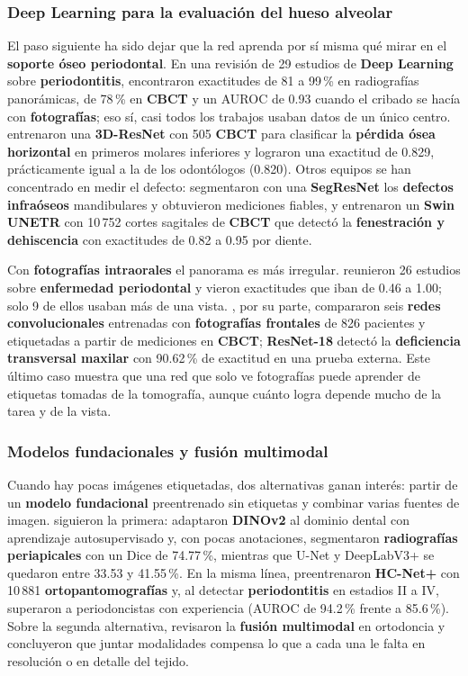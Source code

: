 \documentclass[12pt,a4paper]{article}
\newcommand{\prob}[1]{\textcolor{problema}{\textbf{#1}}}
\newcommand{\sol}[1]{\textcolor{solucion}{\textbf{#1}}}
\newcommand{\dat}[1]{\textcolor{dataset}{\textbf{#1}}}
\newcommand{\prob}[1]{#1}
\newcommand{\sol}[1]{#1}
\newcommand{\dat}[1]{#1}
\begin{document}
\subsubsection{Deep Learning para la evaluación del hueso alveolar}
El paso siguiente ha sido dejar que la red aprenda por sí misma qué mirar
en el \prob{soporte óseo periodontal}. En una revisión de 29 estudios de
\sol{Deep Learning} sobre \prob{periodontitis},
\textcite{tichy2026periodontology} encontraron exactitudes de 81 a 99\,\%
en radiografías panorámicas, de 78\,\% en \dat{CBCT} y un AUROC de 0.93
cuando el cribado se hacía con \dat{fotografías}; eso sí, casi todos los
trabajos usaban datos de un único centro. \textcite{yang2026horizontal}
entrenaron una \sol{3D-ResNet} con 505 \dat{CBCT} para clasificar la
\prob{pérdida ósea horizontal} en primeros molares inferiores y lograron
una exactitud de 0.829, prácticamente igual a la de los odontólogos
(0.820). Otros equipos se han concentrado en medir el defecto:
\textcite{palkovics2026segmentation} segmentaron con una \sol{SegResNet}
los \prob{defectos infraóseos} mandibulares y obtuvieron mediciones
fiables, y \textcite{xu2026swinunetr} entrenaron un \sol{Swin UNETR} con
10\,752 cortes sagitales de \dat{CBCT} que detectó la \prob{fenestración
y dehiscencia} con exactitudes de 0.82 a 0.95 por diente.

Con \dat{fotografías intraorales} el panorama es más irregular.
\textcite{mao2025photographs} reunieron 26 estudios sobre
\prob{enfermedad periodontal} y vieron exactitudes que iban de 0.46 a 1.00;
solo 9 de ellos usaban más de una vista. \textcite{li2026transverse}, por
su parte, compararon seis \sol{redes convolucionales} entrenadas con
\dat{fotografías frontales} de 826 pacientes y etiquetadas a partir de
mediciones en \dat{CBCT}; \sol{ResNet-18} detectó la \prob{deficiencia
transversal maxilar} con 90.62\,\% de exactitud en una prueba externa.
Este último caso muestra que una red que solo ve fotografías puede
aprender de etiquetas tomadas de la tomografía, aunque cuánto logra
depende mucho de la tarea y de la vista.

\subsubsection{Modelos fundacionales y fusión multimodal}
Cuando hay pocas imágenes etiquetadas, dos alternativas ganan interés:
partir de un \sol{modelo fundacional} preentrenado sin etiquetas y
combinar varias fuentes de imagen. \textcite{hu2025selfsupervised}
siguieron la primera: adaptaron \sol{DINOv2} al dominio dental con
aprendizaje autosupervisado y, con pocas anotaciones, segmentaron
\dat{radiografías periapicales} con un Dice de 74.77\,\%, mientras que
U-Net y DeepLabV3+ se quedaron entre 33.53 y 41.55\,\%. En la misma línea,
\textcite{li2025hcnet} preentrenaron \sol{HC-Net+} con 10\,881
\dat{ortopantomografías} y, al detectar \prob{periodontitis} en estadios
II a IV, superaron a periodoncistas con experiencia (AUROC de 94.2\,\%
frente a 85.6\,\%). Sobre la segunda alternativa,
\textcite{feng2026multimodal} revisaron la \sol{fusión multimodal} en
ortodoncia y concluyeron que juntar modalidades compensa lo que a cada una
le falta en resolución o en detalle del tejido.
\end{document}
